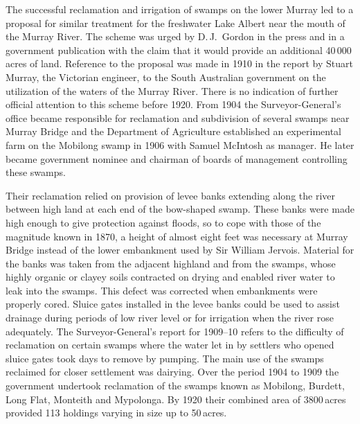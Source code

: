 The successful reclamation and irrigation of swamps on the lower
Murray led to a proposal for similar treatment for the freshwater Lake
Albert near the mouth of the Murray River.  The scheme was urged by
D.\,J.~Gordon  in the press and in a government
publication with the claim that it would provide an additional
40\,000\,acres of land.  Reference to the proposal was made in 1910 in
the report by Stuart Murray,  the Victorian
engineer, to the South Australian government on the utilization of the
waters of the Murray River. There is no indication of further official
attention to this scheme before 1920.  From 1904 the
Surveyor-General's office became responsible for reclamation and
subdivision of several swamps near Murray Bridge and the Department of
Agriculture established an experimental farm on the Mobilong swamp
 in
1906 with Samuel McIntosh  as manager.  He later
became government nominee and chairman of boards of management
controlling these swamps.

Their reclamation relied on provision of levee banks extending along
the river between high land at each end of the bow-shaped swamp.
These banks were made high enough to give protection against floods,
so to cope with those of the magnitude known in 1870, a height of
almost eight feet was necessary at Murray Bridge  instead of the lower embankment used by Sir William Jervois.
Material for the banks was taken from the adjacent highland and from
the swamps, whose highly organic or clayey soils contracted on drying
and enabled river water to leak into the swamps.  This defect was
corrected when embankments were properly cored.  Sluice gates
installed in the levee banks could be used to assist drainage during
periods of low river level or for irrigation when the river rose
adequately. The Surveyor-General's report for 1909--10 refers to the
difficulty of reclamation on certain swamps where the water let in by
settlers who opened sluice gates took days to remove by pumping.  The
main use of the swamps reclaimed for closer settlement was dairying.
Over the period 1904 to 1909 the government undertook reclamation of
the swamps known as Mobilong, Burdett, Long Flat, Monteith and
Mypolonga.  By 1920 their combined area of 3800\,acres provided 113
holdings varying in size up to 50\,acres.


